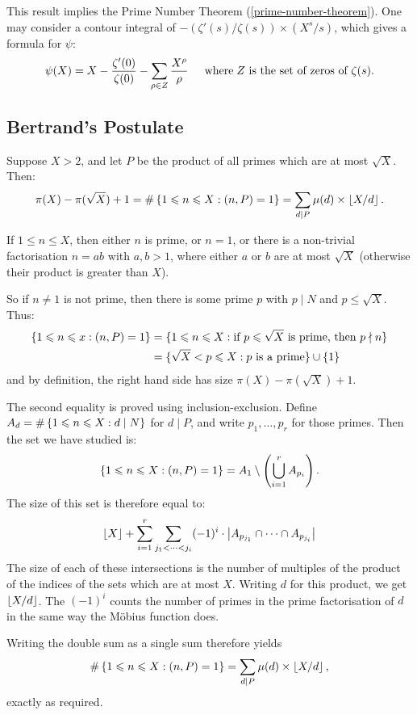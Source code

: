 \documentclass{article}
\begin{document}
This result implies the Prime Number Theorem (\ref{prime-number-theorem}). One may consider a contour integral of $- (\zeta'(s)/\zeta(s)) \times (X^s/s)$, which gives a formula for $\psi$:
\[
\psi(X) = X - \frac{\zeta'(0)}{\zeta(0)} - \sum_{\rho \in Z} \frac{X^\rho}{\rho}
\quad \mathrel{\, \text{where}} Z \text{ is the set of zeros of $\zeta(s)$.}
\]


\subsection{Bertrand's Postulate}
\label{subsection-distribution-of-primes-bertrands-posulate}
\vskip 8pt

\begin{proposition}
    Suppose $X > 2$, and let $P$ be the product of all primes which are at most $\sqrt X$. Then:
    \[
	\pi(X) - \pi(\sqrt X) + 1 = \#\left\lbrace 1 \leqslant n \leqslant X : (n, P) = 1 \right\rbrace = \sum_{d \mid P} \mu(d) \times \left\lfloor X/d\right\rfloor.
	\]
\end{proposition}

\begin{prf}
    If $1 \leq n \leq X$, then either $n$ is prime, or $n = 1$, or there is a non-trivial factorisation $n = ab$ with $a, b > 1$, where either $a$ or $b$ are at most $\sqrt{X}$ (otherwise their product is greater than $X$).
    
    So if $n \neq 1$ is not prime, then there is some prime $p$ with $p \mid N$ and $p \leq \sqrt{X}$. Thus:
    \begin{align*}
    	\left\lbrace 1 \leqslant n \leqslant x : (n, P) = 1 \right\rbrace &= \{ 1 \leqslant n \leqslant X : \text{if $p \leqslant \sqrt X$ is prime, then $p \nmid n$} \} \\
    	&= \{ \sqrt X < p \leqslant X : p \text{ is a prime} \} \cup \left\lbrace 1 \right\rbrace
	\end{align*}
	and by definition, the right hand side has size $\pi(X) - \pi(\sqrt X) + 1$.
	
	The second equality is proved using inclusion-exclusion. Define $A_d = \# \left\lbrace 1 \leqslant n \leqslant X : d \mid N \right\rbrace$ for $d \mid P$, and write $p_1, \dots, p_r$ for those primes. Then the set we have studied is:
	\[
	\left\lbrace 1 \leqslant n \leqslant X : (n, P) = 1 \right\rbrace =
	A_1 \setminus
	\left( \bigcup_{i=1}^r A_{p_i} \right).
	\]
	The size of this set is therefore equal to:
	\[
	\left\lfloor X\right\rfloor +
	\sum_{i = 1}^r \sum_{j_1 < \dots < j_i}
	(-1)^i \cdot \left\lvert A_{p_{j_1}} \cap \dots \cap A_{p_{j_i}} \right\rvert 
	\]
	The size of each of these intersections is the number of multiples of the product of the indices of the sets which are at most $X$. Writing $d$ for this product, we get $\left\lfloor X/d\right\rfloor$. The $(-1)^i$ counts the number of primes in the prime factorisation of $d$ in the same way the M\"obius function does.
	
	Writing the double sum as a single sum therefore yields
	\[
	\#\left\lbrace 1 \leqslant n \leqslant X : (n, P) = 1 \right\rbrace =
	\sum_{d \mid P} \mu(d) \times \left\lfloor X/d\right\rfloor,
	\]
	exactly as required.
\end{prf}
\end{document}

